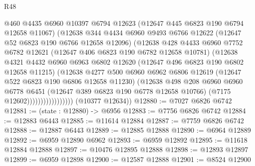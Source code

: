 \begin{lexlean}{R48}
\begin{coremodule}
                            @460
                            @4435
                            @6960
                            @10397
                            @6794
                            @12623
                            (@12647 @445 @6823 @190 @6794 @12658 @11067)
                            (@12638
                              @344
                              @4434
                              @6960
                              @9493
                              @6766
                              @12622
                              (@12647 @52 @6823 @190 @6766 @12658 @12096)
                              (@12638
                                @428
                                @4433
                                @6960
                                @7752
                                @6782
                                @12621
                                (@12647 @406 @6823 @190 @6782 @12658 @10781)
                                (@12638
                                  @4321
                                  @4432
                                  @6960
                                  @6963
                                  @6802
                                  @12620
                                  (@12647 @496 @6823 @190 @6802 @12658 @11215)
                                  (@12638
                                    @4277
                                    @500
                                    @6960
                                    @6962
                                    @6806
                                    @12619
                                    (@12647 @522 @6823 @190 @6806 @12658 @11230)
                                    (@12638
                                      @498
                                      @208
                                      @6960
                                      @6960
                                      @6778
                                      @6451
                                      (@12647 @389 @6823 @190 @6778 @12658 @10766)
                                      (@7175 @12602)))))))))))))))))
      (@10377 @12634))
@12880 := @7027 @6826 @6742
@12881 := (state : @12880) -> @6956
@12883 := @7756 @6826 @6742
@12884 := @12883 @6443
@12885 := @11614 @12884
@12887 := @7759 @6826 @6742
@12888 := @12887 @6443
@12889 := @12885 @12888
@12890 := @6964 @12889
@12892 := @6959 @12890 @6962
@12893 := @6959 @12892
@12895 := @11618 @12884 @12888
@12897 := @10476 @12895 @12888
@12898 := @12893 @12897
@12899 := @6959 @12898
@12900 := @12587 @12888
@12901 := @8524 @12900

\end{coremodule}
\end{lexlean}
